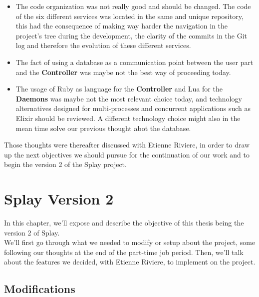 \documentclass{eplmastersthesis}
\begin{document}
        \begin{itemize}
          \item The code organization was not really good and should be changed.
          The code of the six different services was located in the same and
          unique repository, this had the consequence of making way harder
          the navigation in the project's tree during the development, the
          clarity of the commits in the Git log and therefore the evolution
          of these different services.
          \item The fact of using a database as a communication point between
          the user part and the \textbf{Controller} was maybe not the best
          way of proceeding today.
          \item The usage of Ruby as language for the \textbf{Controller} and
          Lua for the \textbf{Daemons} was maybe not the most relevant choice
          today, and technology alternatives designed for multi-processes and
          concurrent applications such as Elixir should be reviewed. A different
          technology choice might also in the mean time solve our previous
          thought abot the database.
        \end{itemize}

        Those thoughts were thereafter discussed with Etienne Riviere, in order
        to draw up the next objectives we should pursue for the continuation
        of our work and to begin the version 2 of the Splay project.

  \chapter{Splay Version 2}


    In this chapter, we'll expose and describe the objective of this thesis
    being the version 2 of Splay.\\

    We'll first go through what we needed to modify or setup about the project,
    some following our thoughts at the end of the part-time job period.
    Then, we'll talk about the features we decided, with Etienne Riviere, to
    implement on the project.

    \section{Modifications} %
\end{document}
